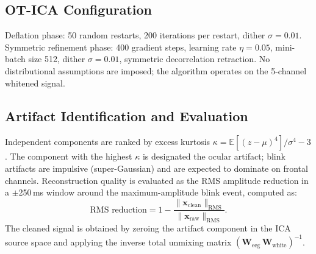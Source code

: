 \documentclass[accepted]{tpm2026} %
\begin{document}
\subsection{OT-ICA Configuration}
Deflation phase: 50 random restarts, 200 iterations per restart, dither $\sigma = 0.01$.
Symmetric refinement phase: 400 gradient steps, learning rate $\eta = 0.05$, mini-batch size 512, dither $\sigma = 0.01$, symmetric decorrelation retraction.
No distributional assumptions are imposed; the algorithm operates on the 5-channel whitened signal.

\subsection{Artifact Identification and Evaluation}
Independent components are ranked by excess kurtosis $\kappa = \mathbb{E}[(z - \mu)^4]/\sigma^4 - 3$.
The component with the highest $\kappa$ is designated the ocular artifact; blink artifacts are impulsive (super-Gaussian) and are expected to dominate on frontal channels.
Reconstruction quality is evaluated as the RMS amplitude reduction in a $\pm$250\,ms window around the maximum-amplitude blink event, computed as:
\begin{equation}
    \text{RMS reduction} = 1 - \frac{\|\mathbf{x}_{\text{clean}}\|_{\text{RMS}}}{\|\mathbf{x}_{\text{raw}}\|_{\text{RMS}}}.
\end{equation}
The cleaned signal is obtained by zeroing the artifact component in the ICA source space and applying the inverse total unmixing matrix $(\mathbf{W}_{\text{eeg}} \, \mathbf{W}_{\text{white}})^{-1}$.
\end{document}
